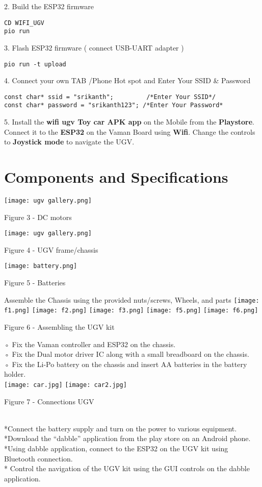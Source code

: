 \documentclass[journal,15pt,twocolumn,tikz, border=5mm]{IEEEtran}
\begin{document}
2. Build the ESP32 firmware
\begin{lstlisting}
CD WIFI_UGV
pio run
\end{lstlisting} 

3. Flash ESP32 firmware ( connect USB-UART adapter )
\begin{lstlisting}
pio run -t upload
\end{lstlisting} 

4. Connect your own TAB /Phone Hot spot and  Enter Your SSID &  Password
\begin{lstlisting}
const char* ssid = "srikanth";         /*Enter Your SSID*/ 
const char* password = "srikanth123"; /*Enter Your Password*
\end{lstlisting} 
5. Install the \textbf{wifi ugv Toy car APK app} on the Mobile from the \textbf{Playstore}. Connect it to the \textbf{ESP32} on the Vaman Board using \textbf{Wifi}. Change the controls to \textbf{Joystick mode} to navigate the UGV.\\
\section{Components and Specifications}
\texttt{[image: ugv gallery.png]}
\centerline{Figure 3 - DC motors}
\texttt{[image: ugv gallery.png]}
\centerline{Figure 4 - UGV frame/chassis}
\texttt{[image: battery.png]}
\centerline{Figure 5 - Batteries}
Assemble the Chassis using the provided nuts/screws, Wheels, and parts
\texttt{[image: f1.png]}
\texttt{[image: f2.png]}
\texttt{[image: f3.png]}
\texttt{[image: f5.png]}
\texttt{[image: f6.png]}
\centerline{Figure 6 - Assembling the UGV kit}
◦ Fix the Vaman controller and ESP32 on the chassis.\\
◦ Fix the Dual motor driver IC along with a small breadboard on the chassis.\\
◦ Fix the Li-Po battery on the chassis and insert AA batteries in the battery holder.\\
\texttt{[image: car.jpg]}
\texttt{[image: car2.jpg]}
\centerline{Figure 7 -  Connections UGV }\\
*Connect the battery supply and turn on the power to various equipment.\\
*Download the “dabble” application from the play store on an Android phone.\\
*Using dabble application, connect to the ESP32 on the UGV kit using Bluetooth connection.\\
* Control the navigation of the UGV kit using the GUI controls on the dabble application.
\end{document}
